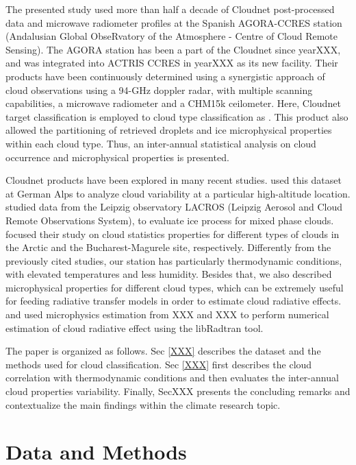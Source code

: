 \documentclass[journal abbreviation, manuscript]{copernicus}
\begin{document}
The presented study used more than half a decade of Cloudnet post-processed data \cite{IlligworthXXX} and microwave radiometer profiles at the Spanish AGORA-CCRES station (Andalusian Global ObseRvatory of the Atmosphere - Centre of Cloud Remote Sensing). The AGORA station has been a part of the Cloudnet since yearXXX, and was integrated into ACTRIS CCRES in yearXXX as its new facility. Their products have been continuously determined using a synergistic approach of cloud observations using a 94-GHz doppler radar, with multiple scanning capabilities, a microwave radiometer and a CHM15k ceilometer. Here, Cloudnet target classification is employed to cloud type classification as \cite{pirloaga, nomokonovaXXX}. This product also allowed the partitioning of retrieved droplets and ice microphysical properties within each cloud type. Thus, an inter-annual statistical analysis on cloud occurrence and microphysical properties is presented.

Cloudnet products have been explored in many recent studies. \cite{StephanXXX} used this dataset at German Alps to analyze cloud variability at a particular high-altitude location. \cite{BuhlXXX} studied data from the Leipzig observatory LACROS (Leipzig Aerosol and Cloud Remote Observations System), to evaluate ice process for mixed phase clouds. \cite{Nomokonova,PirloagaXXX} focused their study on cloud statistics properties for different types of clouds in the Arctic and the Bucharest-Magurele site, respectively. Differently from the previously cited studies, our station has particularly thermodynamic conditions, with elevated temperatures and less humidity. Besides that, we also described microphysical properties for different cloud types, which can be extremely useful for feeding radiative transfer models in order to estimate cloud radiative effects. \cite{XXX} and \cite{XXX} used microphysics estimation from XXX and XXX to perform numerical estimation of cloud radiative effect using the libRadtran tool. 

The paper is organized as follows. Sec \ref{XXX} describes the dataset and the methods used for cloud classification. Sec \ref{XXX} first describes the cloud correlation with thermodynamic conditions and then evaluates the inter-annual cloud properties variability. Finally, Sec{XXX} presents the concluding remarks and contextualize the main findings within the climate research topic. 



\section{Data and Methods}
\end{document}
